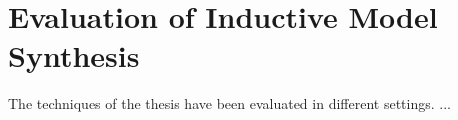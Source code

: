 \chapter{Evaluation of Inductive Model Synthesis\label{chapter:evaluation}}

The techniques of the thesis have been evaluated in different settings. ...




